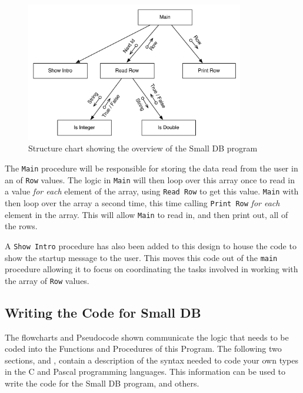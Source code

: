 \begin{figure}[htbp]
   \centering
   \includegraphics[width=0.85\textwidth]{./topics/type-decl/diagrams/SmallDBStruct} 
   \caption{Structure chart showing the overview of the Small DB program}
   \label{fig:small-db-struct}
\end{figure}

The \texttt{Main} procedure will be responsible for storing the data read from the user in an  of \texttt{Row} values. The logic in \texttt{Main} will then loop over this array once to read in a value \emph{for each} element of the array, using \texttt{Read Row} to get this value. \texttt{Main} with then loop over the array a second time, this time calling \texttt{Print Row} \emph{for each} element in the array. This will allow \texttt{Main} to read in, and then print out, all of the rows.

A \texttt{Show Intro} procedure has also been added to this design to house the code to show the startup message to the user. This moves this code out of the \texttt{main} procedure allowing it to focus on coordinating the tasks involved in working with the array of \texttt{Row} values.


\subsection{Writing the Code for Small DB} %
\label{sub:writing_the_code_for_small_db}

The flowcharts and Pseudocode shown communicate the logic that needs to be coded into the Functions and Procedures of this Program. The following two sections,   and   , contain a description of the syntax needed to code your own types in the C and Pascal programming languages. This information can be used to write the code for the Small DB program, and others.

